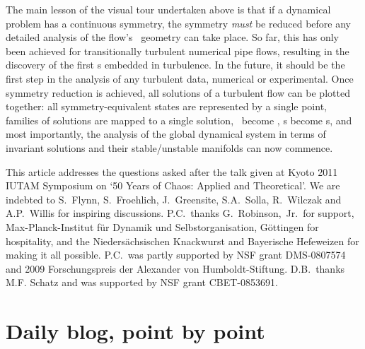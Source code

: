 \documentclass[aip,cha,reprint,
secnumarabic,
nofootinbib, tightenlines,
nobibnotes, showkeys, showpacs,
groupedaddress
]{revtex4-1}
\begin{document}
The main lesson of the visual tour undertaken above is that if a
dynamical problem has a continuous symmetry, the symmetry \emph{must} be
reduced before any detailed analysis of the flow's \statesp\ geometry can
take place. So far, this has only been achieved for transitionally
turbulent numerical pipe flows, resulting in the discovery of
the first \rpo s embedded in turbulence. In the future, it should be the
first step in the analysis of any turbulent data, numerical or
experimental. Once symmetry reduction is achieved, all
solutions of a turbulent flow can be plotted together: all
symmetry-equivalent states are represented by a single point, families of
solutions are mapped to a single solution, \reqva\ become \eqva, \rpo s
become \po s, and most importantly, the analysis of the global dynamical
system in terms of invariant solutions and their stable/unstable
manifolds can now commence.

\begin{acknowledgments}
This article addresses the questions asked after the talk given at
Kyoto 2011 IUTAM Symposium on `50 Years of Chaos: Applied and Theoretical'.
We are indebted to
S.~Flynn,
S.~Froehlich,
J.~Greensite,
S.A.~Solla,
R.~Wilczak
and
A.P.~Willis
for inspiring discussions.
P.C.\ thanks G.~Robinson,~Jr.\ for support,
Max-Planck-Institut f\"ur Dynamik und Selbstorganisation,
G\"ottingen for hospitality,
and the Nieders\"achsischen Knackwurst and Bayerische Hefeweizen for
making it all possible.
P.C.\ was partly supported by NSF grant DMS-0807574
and
2009 Forschungspreis der Alexander von Humboldt-Stiftung.
D.B.\ thanks M.F. Schatz and was supported by NSF grant CBET-0853691.
\end{acknowledgments}





\ifdraft
    \onecolumngrid

    \newpage

    \newpage

    \newpage
    \section{Daily blog, point by point}
    \label{chap:atlas}

\fi
\end{document}
